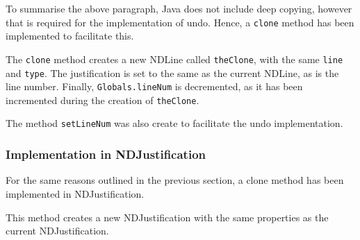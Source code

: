 \documentclass[a4paper]{article}
\begin{document}
To summarise the above paragraph, Java does not include deep copying, however that is required for the implementation of undo. Hence, a \texttt{clone} method has been implemented to facilitate this.

The \texttt{clone} method creates a new NDLine called \texttt{theClone}, with the same \texttt{line} and \texttt{type}. The justification is set to the same as the current NDLine, as is the line number. Finally, \texttt{Globals.lineNum} is decremented, as it has been incremented during the creation of \texttt{theClone}.

The method \texttt{setLineNum} was also create to facilitate the undo implementation.

\subsubsection{Implementation in NDJustification}
For the same reasons outlined in the previous section, a clone method has been implemented in NDJustification.

This method creates a new NDJustification with the same properties as the current NDJustification.
\end{document}
